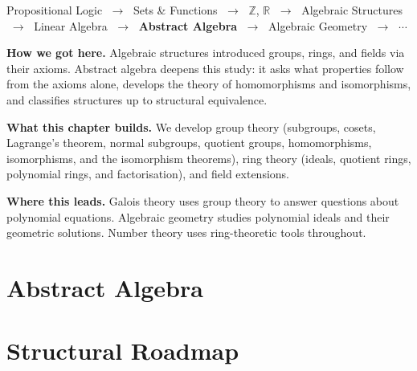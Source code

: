 \begin{tcolorbox}[
  colback=gray!6,
  colframe=gray!40,
  arc=2pt,
  left=8pt, right=8pt, top=6pt, bottom=6pt,
  title={\small\textbf{Where You Are in the Journey}},
  fonttitle=\small\bfseries
]
\begin{center}
\small
Propositional Logic
$\;\to\;$ Sets \& Functions
$\;\to\;$ $\mathbb{Z}$, $\mathbb{R}$
$\;\to\;$ Algebraic Structures
$\;\to\;$ Linear Algebra
$\;\to\;$ \textbf{Abstract Algebra}
$\;\to\;$ Algebraic Geometry
$\;\to\;$ $\cdots$
\end{center}

\medskip
\noindent\textbf{How we got here.}
Algebraic structures introduced groups, rings, and fields via their axioms.
Abstract algebra deepens this study: it asks what properties follow
from the axioms alone, develops the theory of homomorphisms and
isomorphisms, and classifies structures up to structural equivalence.

\medskip
\noindent\textbf{What this chapter builds.}
We develop group theory (subgroups, cosets, Lagrange's theorem,
normal subgroups, quotient groups, homomorphisms, isomorphisms,
and the isomorphism theorems), ring theory (ideals, quotient rings,
polynomial rings, and factorisation), and field extensions.

\medskip
\noindent\textbf{Where this leads.}
Galois theory uses group theory to answer questions about polynomial
equations. Algebraic geometry studies polynomial ideals and their
geometric solutions. Number theory uses ring-theoretic tools throughout.
\end{tcolorbox}
\vspace{1em}


\section{Abstract Algebra}


\section*{Structural Roadmap}

